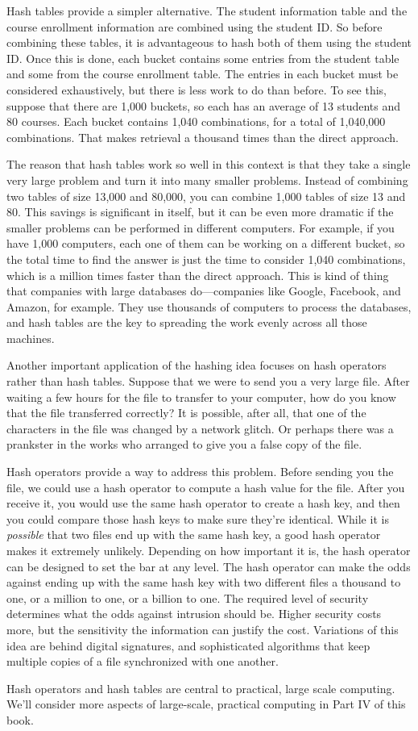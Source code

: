 Hash tables provide a simpler alternative. The student information table
and the course enrollment information are combined using the student ID.
So before combining these tables, it is advantageous to hash both of them
using the student ID. Once this is done, each bucket contains some entries
from the student table and some from the course enrollment table. The entries
in each bucket must be considered exhaustively, but there is less work to do
than before.
To see this, suppose that there are 1,000 buckets, so
each has an average of 13 students and 80 courses. Each bucket
contains 1,040 combinations, for a total of 1,040,000 combinations.
That makes retrieval a thousand times than the direct approach.

The reason that hash tables work so well in this context is that they take
a single very large problem and turn it into many smaller problems. Instead
of combining two tables of size 13,000 and 80,000, you can combine 1,000
tables of size 13 and 80. This savings is significant in itself, but it can
be even more dramatic if the smaller problems can be performed in different
computers. For example, if you have 1,000 computers, each one of them can be
working on a different bucket, so the total time to find the answer is
just the time to consider 1,040 combinations, which is a million times
faster than the direct approach.
This is kind of thing that companies with large databases do---companies like Google, Facebook, and Amazon,
for example. They use thousands of computers to process the databases, and
hash tables are the key to spreading the work evenly across all those
machines.

Another important application of the hashing idea focuses on hash operators
rather than hash tables.
Suppose that we were to send you a very large file. After waiting a few hours
for the file to transfer to your computer, how do you know that the file
transferred correctly? It is possible, after all, that one of the characters
in the file was changed by a network glitch. Or perhaps there was a prankster
in the works who arranged to give you a false copy of the file.

Hash operators provide a way to address this problem.
Before sending you the file, we could use a hash operator to compute a hash
value for the file. After you receive it, you would use the same hash operator
to create a hash key, and then you could compare those hash keys to make sure
they're identical. While it is \emph{possible} that two files end up with the
same hash key, a good hash operator makes it extremely unlikely.
Depending on how important it is, the hash operator can be designed to set
the bar at any level. The hash operator can make the odds against
ending up with the same hash key with two different files a thousand to one,
or a million to one, or a billion to one. The required level of security
determines what the odds against intrusion should be. Higher security
costs more, but the sensitivity the information can justify the cost.
Variations of this idea are behind digital signatures, and sophisticated
algorithms that keep multiple copies of a file synchronized with one another.

Hash operators and hash tables are central to practical, large scale computing.
We'll consider more aspects of large-scale, practical computing
in Part IV of this book.

